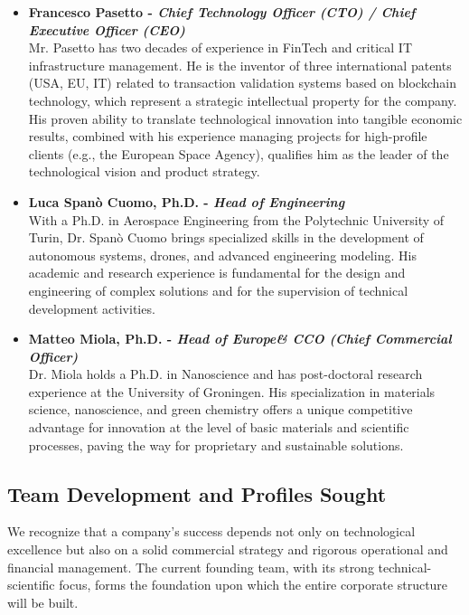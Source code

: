 \documentclass[11pt, a4paper, oneside]{article}
\begin{document}
\begin{itemize}
    \item \textbf{Francesco Pasetto - \textit{Chief Technology Officer (CTO) / Chief Executive Officer (CEO)}} \\
    Mr. Pasetto has two decades of experience in FinTech and critical IT infrastructure management. He is the inventor of three international patents (USA, EU, IT) related to transaction validation systems based on blockchain technology, which represent a strategic intellectual property for the company. His proven ability to translate technological innovation into tangible economic results, combined with his experience managing projects for high-profile clients (e.g., the European Space Agency), qualifies him as the leader of the technological vision and product strategy.

    \item \textbf{Luca Spanò Cuomo, Ph.D. - \textit{Head of Engineering}} \\
    With a Ph.D. in Aerospace Engineering from the Polytechnic University of Turin, Dr. Spanò Cuomo brings specialized skills in the development of autonomous systems, drones, and advanced engineering modeling. His academic and research experience is fundamental for the design and engineering of complex solutions and for the supervision of technical development activities.

    \item \textbf{Matteo Miola, Ph.D. - \textit{Head of Europe\& CCO (Chief Commercial Officer)}} \\
    Dr. Miola holds a Ph.D. in Nanoscience and has post-doctoral research experience at the University of Groningen. His specialization in materials science, nanoscience, and green chemistry offers a unique competitive advantage for innovation at the level of basic materials and scientific processes, paving the way for proprietary and sustainable solutions.
\end{itemize}

\subsection{Team Development and Profiles Sought}

We recognize that a company's success depends not only on technological excellence but also on a solid commercial strategy and rigorous operational and financial management. The current founding team, with its strong technical-scientific focus, forms the foundation upon which the entire corporate structure will be built.
\end{document}
